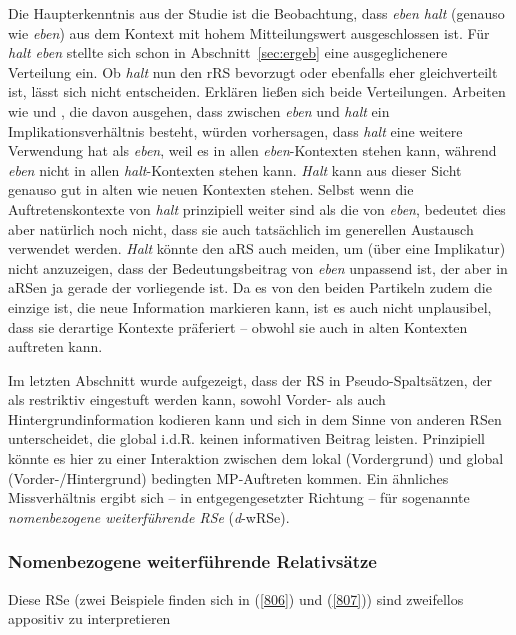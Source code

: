Die Haupterkenntnis aus der Studie ist die Beobachtung, dass \textit{eben halt} (genauso wie \textit{eben}) aus dem Kontext mit hohem Mitteilungswert ausgeschlossen ist. Für \textit{halt eben} stellte sich schon in Abschnitt~\ref{sec:ergeb} eine ausgeglichenere Verteilung ein. Ob \textit{halt} nun den rRS bevorzugt oder ebenfalls eher gleichverteilt ist, lässt sich nicht entscheiden. Erklären ließen sich beide Verteilungen. Arbeiten wie \citet{Thurmair1989} und \citet{Ickler1994}, die davon ausgehen, dass zwischen \textit{eben} und \textit{halt} ein Implikationsverhältnis besteht, würden vorhersagen, dass \textit{halt} eine weitere Verwendung hat als \textit{eben}, weil es in allen \textit{eben}-Kontexten stehen kann, während \textit{eben} nicht in allen \textit{halt}-Kontexten stehen kann. \textit{Halt} kann aus dieser Sicht genauso gut in alten wie neuen Kontexten stehen. Selbst wenn die Auftretenskontexte von \textit{halt} prinzipiell weiter sind als die von \textit{eben}, bedeutet dies aber natürlich noch nicht, dass sie auch tatsächlich im generellen Austausch verwendet werden. \textit{Halt} könnte den aRS auch meiden, um (über eine Implikatur) nicht anzuzeigen, dass der Bedeutungsbeitrag von \textit{eben} unpassend ist, der aber in aRSen ja gerade der vorliegende ist. Da es von den beiden Partikeln zudem die einzige ist, die neue Information markieren kann, ist es auch nicht unplausibel, dass sie derartige Kontexte präferiert – obwohl sie auch in alten Kontexten auftreten kann.

Im letzten Abschnitt wurde aufgezeigt, dass der RS in Pseudo-Spaltsätzen, der als restriktiv eingestuft werden kann, sowohl Vorder- als auch Hintergrundinformation kodieren kann und sich in dem Sinne von anderen RSen unterscheidet, die global i.d.R. keinen informativen Beitrag leisten. Prinzipiell könnte es hier zu einer Interaktion zwischen dem lokal (Vordergrund) und global (Vorder-/Hintergrund) bedingten MP-Auftreten kommen. Ein ähnliches Missverhältnis ergibt sich – in entgegengesetzter Richtung – für sogenannte  \textit{nomenbezogene weiterführende RSe} (\textit{d}-wRSe).

\subsubsection{Nomenbezogene weiterführende Relativsätze}
\label{sec:nwrs}
Diese RSe (zwei Beispiele finden sich in (\ref{806}) und (\ref{807})) sind zweifellos appositiv zu interpretieren

